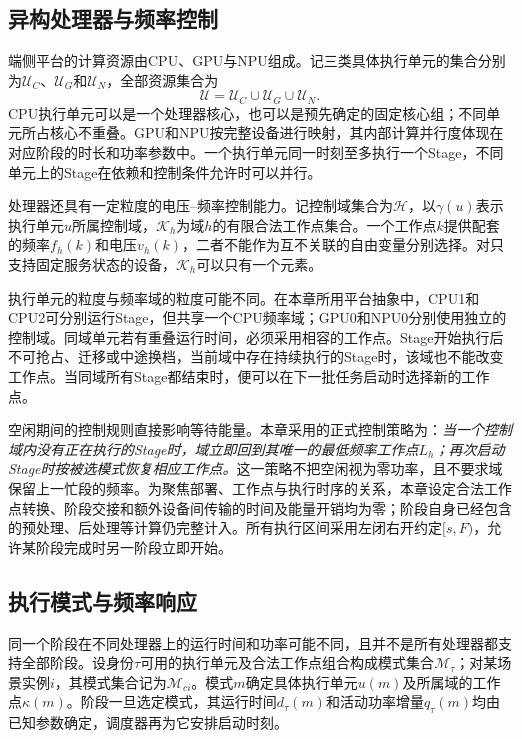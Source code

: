 \subsection{异构处理器与频率控制}

端侧平台的计算资源由CPU、GPU与NPU组成。记三类具体执行单元的集合分别为$\mathcal U_C$、$\mathcal U_G$和$\mathcal U_N$，全部资源集合为
\begin{equation}
 \mathcal U=\mathcal U_C\cup\mathcal U_G\cup\mathcal U_N.
 \label{eq:c3-unit-set}
\end{equation}
CPU执行单元可以是一个处理器核心，也可以是预先确定的固定核心组；不同单元所占核心不重叠。GPU和NPU按完整设备进行映射，其内部计算并行度体现在对应阶段的时长和功率参数中。一个执行单元同一时刻至多执行一个Stage，不同单元上的Stage在依赖和控制条件允许时可以并行。

处理器还具有一定粒度的电压--频率控制能力。记控制域集合为$\mathcal H$，以$\gamma(u)$表示执行单元$u$所属控制域，$\mathcal K_h$为域$h$的有限合法工作点集合。一个工作点$k$提供配套的频率$f_h(k)$和电压$v_h(k)$，二者不能作为互不关联的自由变量分别选择。对只支持固定服务状态的设备，$\mathcal K_h$可以只有一个元素。

执行单元的粒度与频率域的粒度可能不同。在本章所用平台抽象中，CPU1和CPU2可分别运行Stage，但共享一个CPU频率域；GPU0和NPU0分别使用独立的控制域。同域单元若有重叠运行时间，必须采用相容的工作点。Stage开始执行后不可抢占、迁移或中途换档，当前域中存在持续执行的Stage时，该域也不能改变工作点。当同域所有Stage都结束时，便可以在下一批任务启动时选择新的工作点。

空闲期间的控制规则直接影响等待能量。本章采用的正式控制策略为：\emph{当一个控制域内没有正在执行的Stage时，域立即回到其唯一的最低频率工作点$L_h$；再次启动Stage时按被选模式恢复相应工作点。}这一策略不把空闲视为零功率，且不要求域保留上一忙段的频率。为聚焦部署、工作点与执行时序的关系，本章设定合法工作点转换、阶段交接和额外设备间传输的时间及能量开销均为零；阶段自身已经包含的预处理、后处理等计算仍完整计入。所有执行区间采用左闭右开约定$[s,F)$，允许某阶段完成时另一阶段立即开始。

\subsection{执行模式与频率响应}

同一个阶段在不同处理器上的运行时间和功率可能不同，且并不是所有处理器都支持全部阶段。设身份$\tau$可用的执行单元及合法工作点组合构成模式集合$\mathcal M_\tau$；对某场景实例$i$，其模式集合记为$\mathcal M_{ci}$。模式$m$确定具体执行单元$u(m)$及所属域的工作点$\kappa(m)$。阶段一旦选定模式，其运行时间$d_{\tau}(m)$和活动功率增量$q_{\tau}(m)$均由已知参数确定，调度器再为它安排启动时刻。

